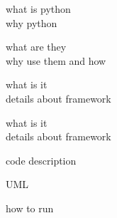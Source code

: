  \label{app:GMPI}

 \label{appsec:GMPI-python}

what is python\\
why python

 \label{appsec:GMPI-npsp}

what are they\\
why use them and how

 \label{appsec:GMPI-openopt}

what is it\\
details about framework

 \label{appsec:GMPI-nx}

what is it\\
details about framework

 \label{appsec:GMPI-allTogether}

code description

UML

how to run